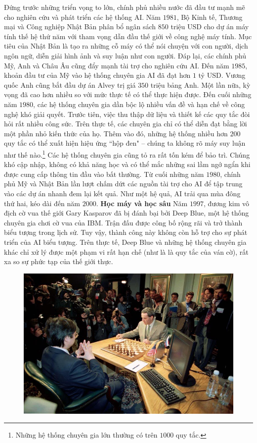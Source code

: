 \begin{multicols}{2}
	\vskip 0.1cm
	Đứng trước những triển vọng to lớn, chính phủ nhiều nước đã đầu tư mạnh mẽ cho nghiên cứu và phát triển các hệ thống AI. Năm $1981$, Bộ Kinh tế, Thương mại và Công nghiệp Nhật Bản phân bổ ngân sách $850$ triệu USD cho dự án máy tính thế hệ thứ năm với tham vọng dẫn đầu thế giới về công nghệ máy tính. Mục tiêu của Nhật Bản là tạo ra những cỗ máy có thể nói chuyện với con người, dịch ngôn ngữ, diễn giải hình ảnh và suy luận như con người. Đáp lại, các chính phủ Mỹ, Anh và Châu Âu cũng đẩy mạnh tài trợ cho nghiên cứu AI. Đến năm $1985$, khoản đầu tư của Mỹ vào hệ thống chuyên gia AI đã đạt hơn $1$ tỷ USD. Vương quốc Anh cũng bắt đầu dự án Alvey trị giá $350$ triệu bảng Anh.
	\vskip 0.1cm
	Một lần nữa, kỳ vọng đã cao hơn nhiều so với mức thực tế có thể thực hiện được. Đến cuối những năm $1980$, các hệ thống chuyên gia dần bộc lộ nhiều vấn đề và hạn chế về công nghệ khó giải quyết. Trước tiên, việc thu thập dữ liệu và thiết kế các quy tắc đòi hỏi rất nhiều công sức. Trên thực tế, các chuyên gia chỉ có thể diễn đạt bằng lời một phần nhỏ kiến thức của họ. Thêm vào đó, những hệ thống nhiều hơn $200$ quy tắc có thể xuất hiện hiệu ứng ``hộp đen" -- chúng ta không rõ máy suy luận như thế nào.\footnote{\color{timhieukhoahoc}Những hệ thống chuyên gia lớn thường có trên $1000$ quy tắc.} Các hệ thống chuyên gia cũng tỏ ra rất tốn kém để bảo trì. Chúng khó cập nhập, không có khả năng học và có thể mắc những sai lầm ngớ ngẩn khi được cung cấp thông tin đầu vào bất thường. 
	\vskip 0.1cm
	Từ cuối những năm $1980$, chính phủ Mỹ và Nhật Bản lần lượt chấm dứt các nguồn tài trợ cho AI để tập trung vào các dự án nhanh đem lại kết quả. Như một hệ quả, AI trải qua mùa đông thứ hai, kéo dài đến năm $2000$.
	\vskip 0.1cm
	\textbf{\color{timhieukhoahoc}Học máy và học sâu}
	\vskip 0.1cm
	Năm $1997$, đương kim vô địch cờ vua thế giới Gary Kasparov đã bị đánh bại bởi Deep Blue, một hệ thống chuyên gia chơi cờ vua của IBM. Trận đấu được công bố rộng rãi và trở thành biểu tượng trong lịch sử. Tuy vậy, thành công này không còn hỗ trợ cho sự phát triển của AI biểu tượng. Trên thực tế, Deep Blue và những hệ thống chuyên gia khác chỉ xử lý được một phạm vi rất hạn chế (như là là quy tắc của ván cờ), rất xa so sự phức tạp của thế giới thực.
	\begin{figure}[H]
		\vspace*{-5pt}
		\centering
		\captionsetup{labelformat= empty, justification=centering}
		\includegraphics[width= 1\linewidth]{DeepBlue.jpg}

\end{figure}
\end{multicols}

